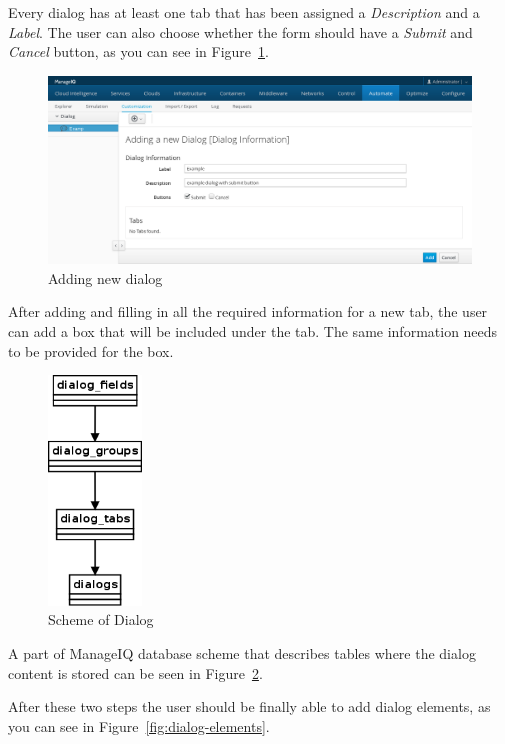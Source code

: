 Every dialog has at least one tab that has been assigned a {\it Description}
and a {\it Label}.
The user can also choose whether the form should have a
{\it Submit} and {\it Cancel} button, as you can see in
Figure~\ref{fig:dialog-box}.

\begin{figure}[b]
  \centering
  \def\svgwidth{\columnwidth}
  \includegraphics[width=14cm,keepaspectratio]{fig/dialog-box}
  \caption{Adding new dialog}\label{fig:dialog-box}
\end{figure}

After adding and filling in all the required information for a new tab, the
user can add a box that will be included under the tab.
The same information needs to be provided for the box.

\begin{figure}
  \centering
	\includegraphics[width=2.5cm,keepaspectratio]{fig/dialog-scheme}
	\caption{Scheme of Dialog}\label{fig:dialog-hierarchy}
\end{figure}

A part of ManageIQ database scheme that describes tables where the dialog
content is stored can be seen in Figure~\ref{fig:dialog-hierarchy}.

After these two steps the user should be finally able to add dialog elements,
as you can see in Figure~\ref{fig:dialog-elements}.

